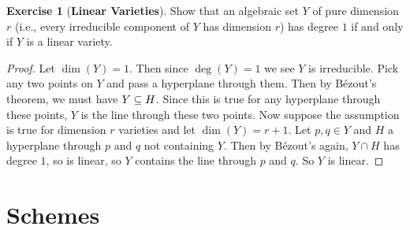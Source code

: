 \documentclass[11pt]{book}
\theoremstyle{definition}
\newtheorem{exercise}{Exercise}[section]
\begin{document}
\begin{exercise}[\textbf{Linear Varieties}]
Show that an algebraic set $Y$ of pure dimension $r$ (i.e., every irreducible component of $Y$ has dimension $r$) has degree $1$ if and only if $Y$ is a linear variety.
\end{exercise}
\begin{proof}
Let $\dim(Y)=1$. Then since $\deg(Y)=1$ we see $Y$ is irreducible. Pick any two points on $Y$ and pass a hyperplane through them. Then by B\'ezout's theorem, we must have $Y\subseteq H$. Since this is true for any hyperplane through these points, $Y$ is the line through these two points. Now suppose the assumption is true for dimension $r$ varieties and let $\dim(Y)=r+1$. Let $p,q\in Y$ and $H$ a hyperplane through $p$ and $q$ not containing $Y$. Then by B\'ezout's again, $Y\cap H$ has degree $1$, so is linear, so $Y$ contains the line through $p$ and $q$. So $Y$ is linear.
\end{proof}
\chapter{Schemes}
\end{document}
